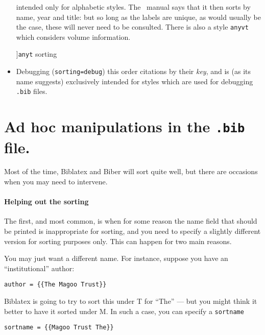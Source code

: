 \begin{itemize}
  intended only for alphabetic styles. The \biblatex~manual says that it
  then sorts by name, year and title: but so long as the labels are
  unique, as would usually be the case, these will never need to be
  consulted. There is also a style \texttt{anyvt} which
  considers volume information.
 \begin{marginfigure}[1ex]
\vspace{3pt}
  \caption[][]{\texttt{anyt} sorting}
  \end{marginfigure}
\item
  Debugging (\texttt{sorting=debug}) this order citations by their
  \emph{key}, and is (as its name suggests) exclusively intended for
  styles which are used for debugging \texttt{.bib} files.
\end{itemize}

\section{Ad hoc manipulations in the \texttt{.bib} file.}

Most of the time, Biblatex and Biber will sort quite well, but there are
occasions when you may need to intervene.

\paragraph{Helping out the sorting}\label{sorting:sortname} The first,
and most common, is when for some reason the name field that should be
printed is inappropriate for sorting, and you need to specify a
slightly different version for sorting purposes only. This can happen
for two main reasons.

You may just want a different name. For instance, suppose you have an
``institutional'' author:
\begin{Verbatim}
author = {{The Magoo Trust}}
\end{Verbatim}
Biblatex is going to try to sort this under T for ``The'' --- but you
might think it better to have it sorted under M. In such a case, you
can specify a \texttt{sortname}
\begin{Verbatim}
sortname = {{Magoo Trust The}}
\end{Verbatim}

